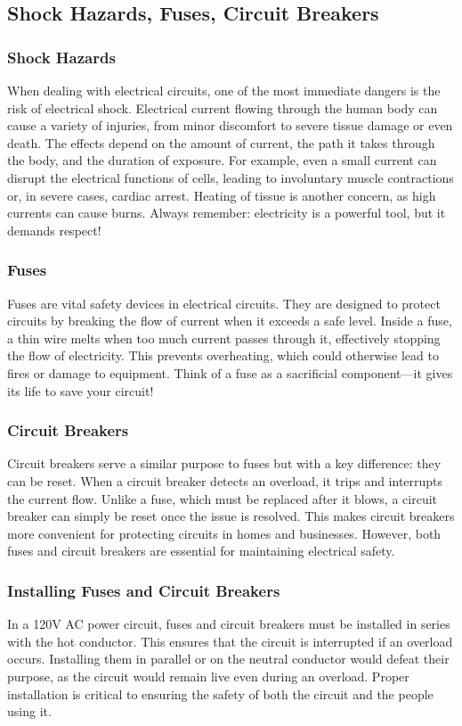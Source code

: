 \subsection{Shock Hazards, Fuses, Circuit Breakers}
\label{subsec:shock-fuses}

\subsubsection*{Shock Hazards}
When dealing with electrical circuits, one of the most immediate dangers is the risk of electrical shock. Electrical current flowing through the human body can cause a variety of injuries, from minor discomfort to severe tissue damage or even death. The effects depend on the amount of current, the path it takes through the body, and the duration of exposure. For example, even a small current can disrupt the electrical functions of cells, leading to involuntary muscle contractions or, in severe cases, cardiac arrest. Heating of tissue is another concern, as high currents can cause burns. Always remember: electricity is a powerful tool, but it demands respect!

\subsubsection*{Fuses}
Fuses are vital safety devices in electrical circuits. They are designed to protect circuits by breaking the flow of current when it exceeds a safe level. Inside a fuse, a thin wire melts when too much current passes through it, effectively stopping the flow of electricity. This prevents overheating, which could otherwise lead to fires or damage to equipment. Think of a fuse as a sacrificial component—it gives its life to save your circuit!

\subsubsection*{Circuit Breakers}
Circuit breakers serve a similar purpose to fuses but with a key difference: they can be reset. When a circuit breaker detects an overload, it trips and interrupts the current flow. Unlike a fuse, which must be replaced after it blows, a circuit breaker can simply be reset once the issue is resolved. This makes circuit breakers more convenient for protecting circuits in homes and businesses. However, both fuses and circuit breakers are essential for maintaining electrical safety.

\subsubsection*{Installing Fuses and Circuit Breakers}
In a 120V AC power circuit, fuses and circuit breakers must be installed in series with the hot conductor. This ensures that the circuit is interrupted if an overload occurs. Installing them in parallel or on the neutral conductor would defeat their purpose, as the circuit would remain live even during an overload. Proper installation is critical to ensuring the safety of both the circuit and the people using it.

